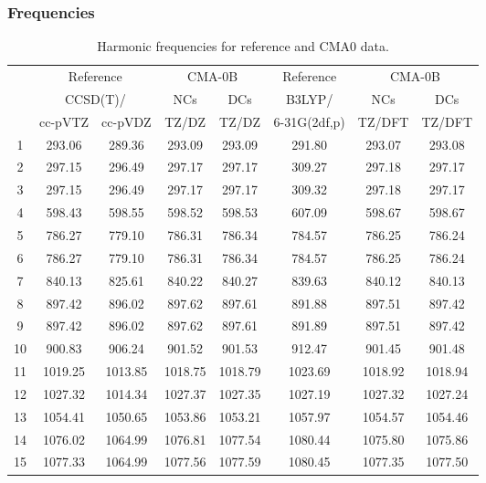\documentclass[10pt,oneside]{article}
\begin{document}
\clearpage

\subsubsection*{Frequencies}
\begin{table}[h!]
\centering
\caption{Harmonic frequencies for reference and CMA0 data.}
\begin{tabular}{cccccccc}
\toprule
{} & \multicolumn{2}{c}{Reference} & \multicolumn{2}{c}{CMA-0B} &    Reference & \multicolumn{2}{c}{CMA-0B} \\
{} & \multicolumn{2}{c}{CCSD(T)/} &     NCs &     DCs &       B3LYP/ &     NCs &     DCs \\
{} &   cc-pVTZ & cc-pVDZ &   TZ/DZ &   TZ/DZ & 6-31G(2df,p) &  TZ/DFT &  TZ/DFT \\
\midrule
1  &    293.06 &  289.36 &  293.09 &  293.09 &       291.80 &  293.07 &  293.08 \\
2  &    297.15 &  296.49 &  297.17 &  297.17 &       309.27 &  297.18 &  297.17 \\
3  &    297.15 &  296.49 &  297.17 &  297.17 &       309.32 &  297.18 &  297.17 \\
4  &    598.43 &  598.55 &  598.52 &  598.53 &       607.09 &  598.67 &  598.67 \\
5  &    786.27 &  779.10 &  786.31 &  786.34 &       784.57 &  786.25 &  786.24 \\
6  &    786.27 &  779.10 &  786.31 &  786.34 &       784.57 &  786.25 &  786.24 \\
7  &    840.13 &  825.61 &  840.22 &  840.27 &       839.63 &  840.12 &  840.13 \\
8  &    897.42 &  896.02 &  897.62 &  897.61 &       891.88 &  897.51 &  897.42 \\
9  &    897.42 &  896.02 &  897.62 &  897.61 &       891.89 &  897.51 &  897.42 \\
10 &    900.83 &  906.24 &  901.52 &  901.53 &       912.47 &  901.45 &  901.48 \\
11 &   1019.25 & 1013.85 & 1018.75 & 1018.79 &      1023.69 & 1018.92 & 1018.94 \\
12 &   1027.32 & 1014.34 & 1027.37 & 1027.35 &      1027.19 & 1027.32 & 1027.24 \\
13 &   1054.41 & 1050.65 & 1053.86 & 1053.21 &      1057.97 & 1054.57 & 1054.46 \\
14 &   1076.02 & 1064.99 & 1076.81 & 1077.54 &      1080.44 & 1075.80 & 1075.86 \\
15 &   1077.33 & 1064.99 & 1077.56 & 1077.59 &      1080.45 & 1077.35 & 1077.50 \\

\end{tabular}
\end{table}
\end{document}
